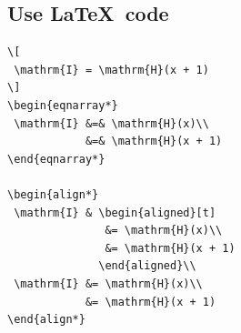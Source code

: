 \documentclass{article}
\begin{document}
\subsection{Use \LaTeX{}\ code}

\begin{verbatim}
\[
 \mathrm{I} = \mathrm{H}(x + 1)
\]
\begin{eqnarray*}
 \mathrm{I} &=& \mathrm{H}(x)\\
            &=& \mathrm{H}(x + 1)
\end{eqnarray*}

\begin{align*}
 \mathrm{I} & \begin{aligned}[t]
               &= \mathrm{H}(x)\\
               &= \mathrm{H}(x + 1)
              \end{aligned}\\
 \mathrm{I} &= \mathrm{H}(x)\\
            &= \mathrm{H}(x + 1)
\end{align*}
\end{verbatim}
\end{document}

